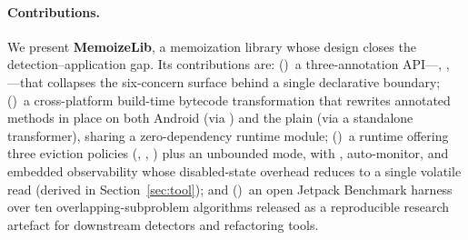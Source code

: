 \paragraph{Contributions.} We present \textbf{MemoizeLib}, a memoization library whose design closes the detection--application gap. Its contributions are: ()~a three-annotation API---, , ---that collapses the six-concern surface behind a single declarative boundary; ()~a cross-platform build-time bytecode transformation that rewrites annotated methods in place on both Android (via \agp) and the plain \jvm (via a standalone transformer), sharing a zero-dependency runtime module; ()~a runtime offering three eviction policies (\lru, \fifo, \lfu) plus an unbounded mode, with \ttl, auto-monitor, and embedded observability whose disabled-state overhead reduces to a single volatile read (derived in Section~\ref{sec:tool}); and ()~an open Jetpack Benchmark harness over ten overlapping-subproblem algorithms released as a reproducible research artefact for downstream detectors and refactoring tools.
